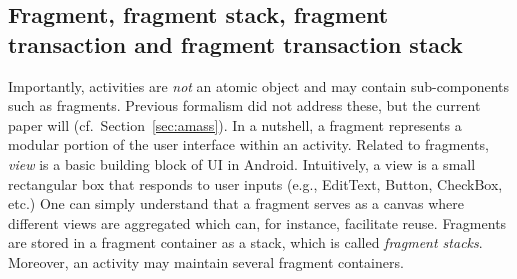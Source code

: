 

\subsection{Fragment, fragment stack, fragment transaction and fragment transaction stack}

Importantly, activities are \emph{not} an atomic object and may contain sub-components such as %
fragments. %
Previous formalism did not address these, but the current paper will (cf.\ Section~\ref{sec:amass}). In a nutshell, %
a fragment represents a modular portion of the user interface within an activity. 
%
%			
Related to fragments, \emph{view} is a basic building block of UI in Android. Intuitively, a view is a small rectangular box that responds to user inputs (e.g., EditText, Button, CheckBox, etc.) One can simply understand that a fragment serves as a canvas where different views are aggregated which can, for instance, facilitate reuse. Fragments are stored in a fragment container as a stack, which is called \emph{fragment stacks}. Moreover, an activity may maintain several fragment containers. 
 




